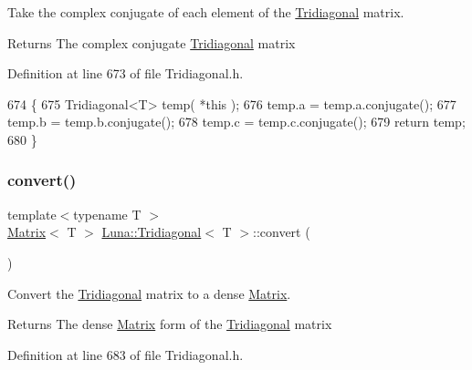Take the complex conjugate of each element of the \hyperlink{classLuna_1_1Tridiagonal}{Tridiagonal} matrix. 

\begin{DoxyReturn}{Returns}
The complex conjugate \hyperlink{classLuna_1_1Tridiagonal}{Tridiagonal} matrix 
\end{DoxyReturn}


Definition at line 673 of file Tridiagonal.\+h.


\begin{DoxyCode}
674   \{
675     Tridiagonal<T> temp( *\textcolor{keyword}{this} );
676     temp.a = temp.a.conjugate();
677     temp.b = temp.b.conjugate();
678     temp.c = temp.c.conjugate();
679     \textcolor{keywordflow}{return} temp;
680   \}
\end{DoxyCode}
\mbox{\label{classLuna_1_1Tridiagonal_a08725d56da8a556ebbd7dd810006cea3}} 
\subsubsection{\texorpdfstring{convert()}{convert()}}
{\footnotesize\ttfamily template$<$typename T $>$ \\
\hyperlink{classLuna_1_1Matrix}{Matrix}$<$ T $>$ \hyperlink{classLuna_1_1Tridiagonal}{Luna\+::\+Tridiagonal}$<$ T $>$\+::convert (\begin{DoxyParamCaption}{ }\end{DoxyParamCaption})\hspace{0.3cm}{\ttfamily [inline]}}



Convert the \hyperlink{classLuna_1_1Tridiagonal}{Tridiagonal} matrix to a dense \hyperlink{classLuna_1_1Matrix}{Matrix}. 

\begin{DoxyReturn}{Returns}
The dense \hyperlink{classLuna_1_1Matrix}{Matrix} form of the \hyperlink{classLuna_1_1Tridiagonal}{Tridiagonal} matrix 
\end{DoxyReturn}


Definition at line 683 of file Tridiagonal.\+h.


